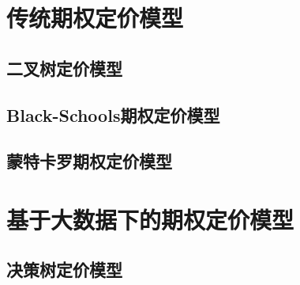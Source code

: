 \chapter{传统期权定价模型}

\section{二叉树定价模型}


\section{Black-Schools期权定价模型}


\section{蒙特卡罗期权定价模型}




\chapter{基于大数据下的期权定价模型}

\section{决策树定价模型}
